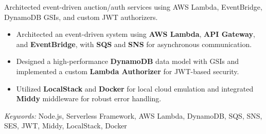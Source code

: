 \nointent
{}

\nointent
Architected event-driven auction/auth services using AWS Lambda, EventBridge, DynamoDB GSIs, and custom JWT authorizers.

\begin{itemize}
    \item Architected an event-driven system using \textbf{AWS Lambda}, \textbf{API Gateway}, and \textbf{EventBridge}, with \textbf{SQS} and \textbf{SNS} for asynchronous communication.
    \item Designed a high-performance \textbf{DynamoDB} data model with GSIs and implemented a custom \textbf{Lambda Authorizer} for JWT-based security.
    \item Utilized \textbf{LocalStack} and \textbf{Docker} for local cloud emulation and integrated \textbf{Middy} middleware for robust error handling.
\end{itemize}

\nointent
\textit{Keywords:} Node.js, Serverless Framework, AWS Lambda, DynamoDB, SQS, SNS, SES, JWT, Middy, LocalStack, Docker